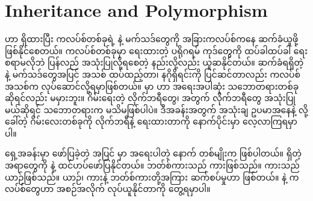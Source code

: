 \chapter{Inheritance and Polymorphism}



 ဟာ ရှိထားပြီး ကလပ်စ်တစ်ခုရဲ့  နဲ့ မက်သဒ်တွေကို အခြားကလပ်စ်ကနေ ဆက်ခံယူဖို့ ဖြစ်နိုင်စေတယ်။ ကလပ်စ်တစ်ခုမှာ ရေးထားတဲ့ ပရိုဂရမ် ကုဒ်တွေကို ထပ်ခါထပ်ခါ ရေးစရာမလိုဘဲ ပြန်လည် အသုံးပြုလို့ရစေတဲ့ နည်းလို့လည်း ယူဆနိုင်တယ်။ ဆက်ခံရရှိတဲ့   နဲ့ မက်သဒ်တွေအပြင် အသစ် ထပ်ထည့်တာ၊ နဂိုရှိရင်းကို ပြင်ဆင်တာလည်း ကလပ်စ်အသစ်က  လုပ်ဆောင်လို့ရမှာဖြစ်တယ်။  မှာ  ဟာ အရေးအပါဆုံး သဘောတရားတစ်ခု ဆိုရင်လည်း မမှားဘူး။ ဂိမ်းရေးတဲ့ လိုက်ဘရီတွေ၊  အတွက် လိုက်ဘရီတွေ အသုံးပြုမယ်ဆိုရင်  သဘောတရားက မသိမဖြစ်ပါပဲ။  ဒီအခန်းအတွက်  အသုံးချ ဥပမာအနေနဲ့  လို့ခေါ်တဲ့ ဂိမ်းလေးတစ်ခုကို  လိုက်ဘရီနဲ့ ရေးထားတာကို နောက်ပိုင်းမှာ လေ့လာကြရမှာပါ။

ရှေ့အခန်းမှာ ဖော်ပြခဲ့တဲ့  အပြင်  မှာ အရေးပါတဲ့ နောက်  တစ်မျိုးက  ဖြစ်ပါတယ်။  ရှိတဲ့ အရာတွေကို  နဲ့ ထင်ဟပ်ဖော်ပြနိုင်တယ်။  ဘတ်စ်ကားသည် ကားဖြစ်သည်။ ကားသည် ယာဉ်ဖြစ်သည်။ ယာဉ်၊ ကားနဲ့ ဘတ်စ်ကားတို့အကြား ဆက်စပ်မှုဟာ  ဖြစ်တယ်။  \fEn{,}  နဲ့  ကလပ်စ်တွေဟာ အစဉ်အလိုက်  လုပ်ယူနိုင်တာကို တွေ့ရမှာပါ။




